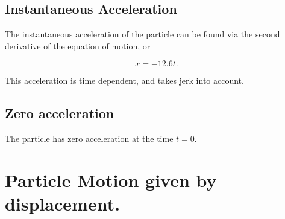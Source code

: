 \documentclass[11pt, letterpaper]{article}
\begin{document}
\subsection{Instantaneous Acceleration}

The instantaneous acceleration of the particle can be found via the second 
derivative of the equation of motion, or

\begin{equation}
	\ddot{x} = -12.6t.
\end{equation}

This acceleration is time dependent, and takes jerk into account. 

\subsection{Zero acceleration}

The particle has zero acceleration at the time $t=0$.


\section{Particle Motion given by displacement.}
\end{document}
